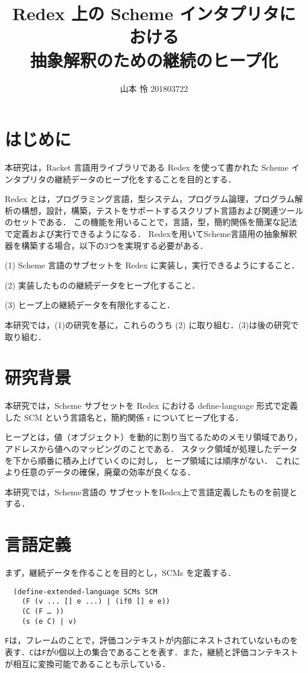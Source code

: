 \documentclass[twocolumn]{jsarticle}
\title{\textbf{Redex 上の Scheme インタプリタにおける\\抽象解釈のための継続のヒープ化}}
\author{山本 怜 201803722}
\date{} %
\begin{document}
\maketitle
\thispagestyle{fancy}

\section{はじめに}
本研究は，Racket 言語用ライブラリである Redex を使って書かれた Scheme インタプリタの継続データのヒープ化をすることを目的とする．

Redex とは，プログラミング言語，型システム，プログラム論理，プログラム解析の構想，設計，構築，テストをサポートするスクリプト言語および関連ツールのセットである．
この機能を用いることで，言語，型，簡約関係を簡潔な記法で定義および実行できるようになる． 
Redexを用いてScheme言語用の抽象解釈器を構築する場合，以下の3つを実現する必要がある．
\begin{description}
\item{(1)} Scheme 言語のサブセット\cite{racket-ref1}を Redex に実装し，実行できるようにすること．
\item{(2)} 実装したものの継続データをヒープ化すること．
\item{(3)} ヒープ上の継続データを有限化すること．
\end{description}

本研究では，(1)の研究\cite{racket-ref2}を基に，これらのうち (2) に取り組む．(3)は後の研究\cite{racket-ref3}で取り組む．

\section{研究背景}
本研究では，Scheme サブセットを Redex における define-language 形式で定義した SCM という言語名と，簡約関係 r についてヒープ化する．

ヒープとは，値（オブジェクト）を動的に割り当てるためのメモリ領域であり，アドレスから値へのマッピングのことである．
スタック領域が処理したデータを下から順番に積み上げていくのに対し， ヒープ領域には順序がない． これにより任意のデータの確保，廃棄の効率が良くなる．

本研究では，Scheme言語の サブセットをRedex上で言語定義したもの\cite{racket-ref2}を前提とする．

\section{言語定義}
まず，継続データを作ることを目的とし，SCMs を定義する．
\begin{verbatim}
  (define-extended-language SCMs SCM
    (F (v ... [] e ...) | (if0 [] e e))
    (C (F … ))
    (s (e C) | v)
\end{verbatim}
\verb|F|は，フレームのことで，評価コンテキストが内部にネストされていないものを表す．\verb|C|は\verb|F|が0個以上の集合であることを表す．また，継続と評価コンテキストが相互に変換可能であることも示している．
\end{document}
